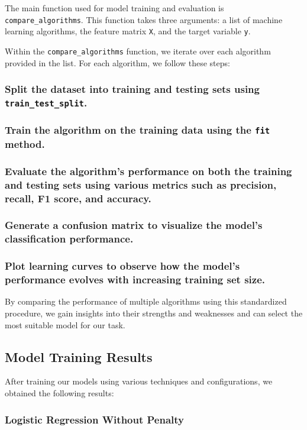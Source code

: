 \documentclass[conference]{IEEEtran}
\begin{document}
The main function used for model training and evaluation is \texttt{compare\_algorithms}. This function takes three arguments: a list of machine learning algorithms, the feature matrix \texttt{X}, and the target variable \texttt{y}.

Within the \texttt{compare\_algorithms} function, we iterate over each algorithm provided in the list. For each algorithm, we follow these steps:

\subsubsection{Split the dataset into training and testing sets using \texttt{train\_test\_split}.}
\subsubsection{Train the algorithm on the training data using the \texttt{fit} method.}
\subsubsection{Evaluate the algorithm's performance on both the training and testing sets using various metrics such as precision, recall, F1 score, and accuracy.}
\subsubsection{Generate a confusion matrix to visualize the model's classification performance.}
\subsubsection{Plot learning curves to observe how the model's performance evolves with increasing training set size.}

By comparing the performance of multiple algorithms using this standardized procedure, we gain insights into their strengths and weaknesses and can select the most suitable model for our task.

\subsection{Model Training Results}

After training our models using various techniques and configurations, we obtained the following results:

\subsubsection{Logistic Regression Without Penalty}
\end{document}
